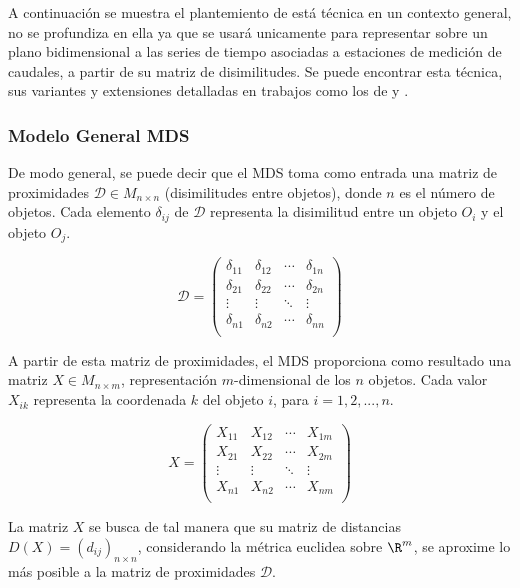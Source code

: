 \documentclass[12pt,oneside]{book}\usepackage[]{graphicx}\usepackage[]{color}
\theoremstyle{definition} %
\begin{document}
A continuación se muestra el plantemiento de está técnica en un contexto general, no se profundiza en ella ya que se usará unicamente para representar sobre un plano bidimensional a las series de tiempo asociadas a estaciones de medición de caudales, a partir de su matriz de disimilitudes. Se puede encontrar esta técnica, sus variantes y extensiones detalladas en trabajos como los de \citeauthor{borg2003modern} \citeyear{borg2003modern} y \citeauthor{cox2000multidimensional} \citeyear{cox2000multidimensional}.

\subsubsection{Modelo General MDS }

De modo general, se puede decir que el MDS toma como entrada una matriz de proximidades $\mathcal{D} \in M_{n \times n}$ (disimilitudes entre objetos), donde $n$ es el número de objetos. Cada elemento $\delta_{ij}$ de $\mathcal{D}$ representa la disimilitud entre un objeto $O_i$ y el objeto $O_j$.

$$ \mathcal{D} = \begin{pmatrix}
\delta_{11} & \delta_{12} & \cdots & \delta_{1n} \\
\delta_{21} & \delta_{22} & \cdots & \delta_{2n} \\
\vdots & \vdots &  \ddots & \vdots \\
\delta_{n1} & \delta_{n2} & \cdots & \delta_{nn} \\
\end{pmatrix} $$

A partir de esta matriz de proximidades, el MDS proporciona como resultado una matriz $X \in M_{n \times m}$, representación $m$-dimensional de los $n$ objetos. Cada valor $X_{ik}$ representa la coordenada $k$ del objeto $i$, para $i=1,2,...,n$. 

$$ X= \begin{pmatrix}
X_{11} & X_{12} & \cdots & X_{1m} \\
X_{21} & X_{22} & \cdots & X_{2m} \\
\vdots & \vdots &  \ddots & \vdots \\
X_{n1} & X_{n2} & \cdots & X_{nm} \\
\end{pmatrix} $$


La matriz $X$ se busca de tal manera que su matriz de distancias $D(X) = (d_{ij})_{n\times n}$, considerando la métrica euclidea sobre $\R^m$, se aproxime lo más posible a la matriz de proximidades $\mathcal{D}$.
\end{document}
